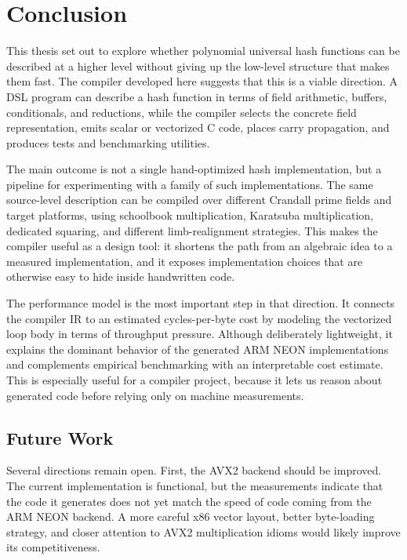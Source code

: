 \chapter{Conclusion}
\label{ch:conclusion}

This thesis set out to explore whether polynomial universal hash functions can be described at a higher level without giving up the low-level structure that makes them fast. The compiler developed here suggests that this is a viable direction. A DSL program can describe a hash function in terms of field arithmetic, buffers, conditionals, and reductions, while the compiler selects the concrete field representation, emits scalar or vectorized C code, places carry propagation, and produces tests and benchmarking utilities.

The main outcome is not a single hand-optimized hash implementation, but a pipeline for experimenting with a family of such implementations. The same source-level description can be compiled over different Crandall prime fields and target platforms, using schoolbook multiplication, Karatsuba multiplication, dedicated squaring, and different limb-realignment strategies. This makes the compiler useful as a design tool: it shortens the path from an algebraic idea to a measured implementation, and it exposes implementation choices that are otherwise easy to hide inside handwritten code.

The performance model is the most important step in that direction. It connects the compiler IR to an estimated cycles-per-byte cost by modeling the vectorized loop body in terms of throughput pressure. Although deliberately lightweight, it explains the dominant behavior of the generated ARM NEON implementations and complements empirical benchmarking with an interpretable cost estimate. This is especially useful for a compiler project, because it lets us reason about generated code before relying only on machine measurements.

\section{Future Work}
\label{sec:future-work}

Several directions remain open. First, the AVX2 backend should be improved. The current implementation is functional, but the measurements indicate that the code it generates does not yet match the speed of code coming from the ARM NEON backend. A more careful x86 vector layout, better byte-loading strategy, and closer attention to AVX2 multiplication idioms would likely improve its competitiveness.

